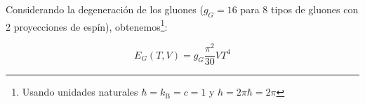 Considerando la degeneración de los gluones ($g_G = 16$ para 8 tipos de gluones con 2 proyecciones de espín), obtenemos\footnote{Usando unidades naturales $\hbar={k}_{\mathrm{B}}=c=1$ y $h=2\pi \hbar = 2\pi$}:

\begin{equation}\label{eq-BE-Etotalgluons}
E_G(T,V) = g_G \frac{\pi^2}{30} V T^4
\end{equation}











